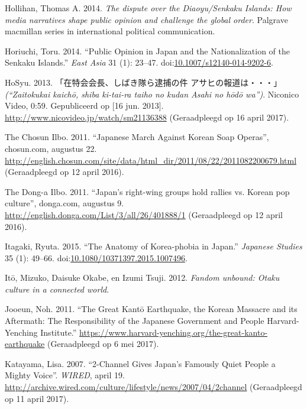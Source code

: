 \documentclass[10.5pt,dutch,]{article}
\begin{document}
\hypertarget{ref-hollihanux5fdisputeux5f2014}{}
Hollihan, Thomas A. 2014. \emph{The dispute over the Diaoyu/Senkaku
Islands: How media narratives shape public opinion and challenge the
global order}. Palgrave macmillan series in international political
communication.

\hypertarget{ref-horiuchiux5fpublicux5f2014}{}
Horiuchi, Toru. 2014. “Public Opinion in Japan and the Nationalization of
the Senkaku Islands.”  \emph{East Asia} 31 (1): 23--47.
doi:\href{https://doi.org/10.1007/s12140-014-9202-6}{10.1007/s12140-014-9202-6}.

\hypertarget{ref-hosyuux5fzaitokukaiux5f2013}{}
HoSyu. 2013.  「在特会会長、しばき隊ら逮捕の件 アサヒの報道は・・・」 \emph{(“Zaitokukai kaichō, shiba ki-tai-ra taiho no kudan Asahi no hōdō wa”)}. Niconico Video, 0:59. Gepubliceerd op [16 jun. 2013]. \url{http://www.nicovideo.jp/watch/sm21136388} (Geraadpleegd op 16 april 2017).

\hypertarget{ref-theux5fchosunux5filboux5fjapaneseux5f2011}{}
The Chosun Ilbo. 2011. “Japanese March Against Korean Soap Operas”, chosun.com, augustus 22.\url{ http://english.chosun.com/site/data/html_dir/2011/08/22/2011082200679.html} (Geraadpleegd op 12 april 2016).

\hypertarget{ref-theux5fdongaux5filboux5fjapansux5f2011}{}
The Dong-a Ilbo. 2011. “Japan’s right-wing groups hold rallies vs. Korean pop culture”, donga.com, augustus 9. \url{http://english.donga.com/List/3/all/26/401888/1} (Geraadpleegd op 12 april 2016).

\hypertarget{ref-itagakiux5fanatomyux5f2015}{}
Itagaki, Ryuta. 2015. “The Anatomy of Korea-phobia in Japan.” 
\emph{Japanese Studies} 35 (1): 49--66.
doi:\href{https://doi.org/10.1080/10371397.2015.1007496}{10.1080/10371397.2015.1007496}.

\hypertarget{ref-itoux5ffandomux5f2012}{}
Itō, Mizuko, Daisuke Okabe, en Izumi Tsuji. 2012. \emph{Fandom unbound:
Otaku culture in a connected world}.

\hypertarget{ref-jooeunux5fgreatux5f2011}{}
Jooeun, Noh. 2011. “The Great Kantō Earthquake, the Korean Massacre and
its Aftermath: The Responsibility of the Japanese Government and People
\textbar{} Harvard-Yenching Institute.” 
\url{https://www.harvard-yenching.org/the-great-kanto-earthquake} (Geraadpleegd op 6 mei 2017).

\hypertarget{ref-katayamaux5f2-channelux5f2007}{}
Katayama, Lisa. 2007. “2-Channel Gives Japan’s Famously Quiet People a Mighty Voice”. \emph{WIRED}, april 19. \url{http://archive.wired.com/culture/lifestyle/news/2007/04/2channel} (Geraadpleegd op 11 april 2017).
\end{document}
